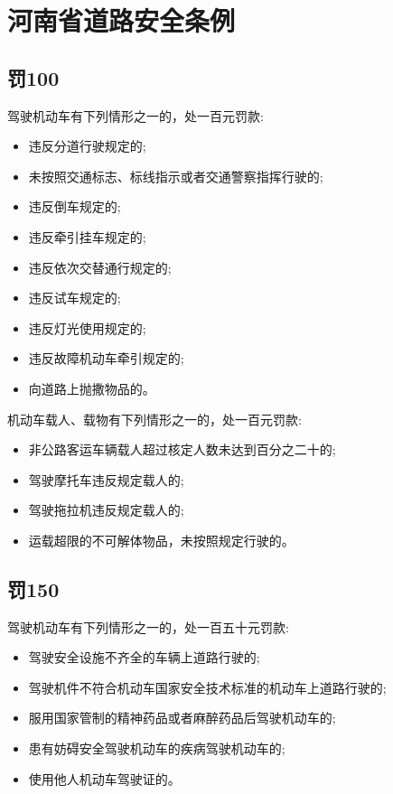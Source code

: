 \section{河南省道路安全条例}

\subsection*{罚100}

\noindent 驾驶机动车有下列情形之一的，处一百元罚款:

\begin{itemize}
    \item 违反分道行驶规定的;
    \item 未按照交通标志、标线指示或者交通警察指挥行驶的;
    \item 违反倒车规定的;
    \item 违反牵引挂车规定的;
    \item 违反依次交替通行规定的;
    \item 违反试车规定的;
    \item 违反灯光使用规定的;
    \item 违反故障机动车牵引规定的;
    \item 向道路上抛撒物品的。
\end{itemize}

\noindent 机动车载人、载物有下列情形之一的，处一百元罚款:

\begin{itemize}
    \item 非公路客运车辆载人超过核定人数未达到百分之二十的;
    \item 驾驶摩托车违反规定载人的;
    \item 驾驶拖拉机违反规定载人的;
    \item 运载超限的不可解体物品，未按照规定行驶的。
\end{itemize}

\subsection*{罚150}

\noindent 驾驶机动车有下列情形之一的，处一百五十元罚款:

\begin{itemize}
    \item 驾驶安全设施不齐全的车辆上道路行驶的;
    \item 驾驶机件不符合机动车国家安全技术标准的机动车上道路行驶的;
    \item 服用国家管制的精神药品或者麻醉药品后驾驶机动车的;
    \item 患有妨碍安全驾驶机动车的疾病驾驶机动车的;
    \item 使用他人机动车驾驶证的。
\end{itemize}

